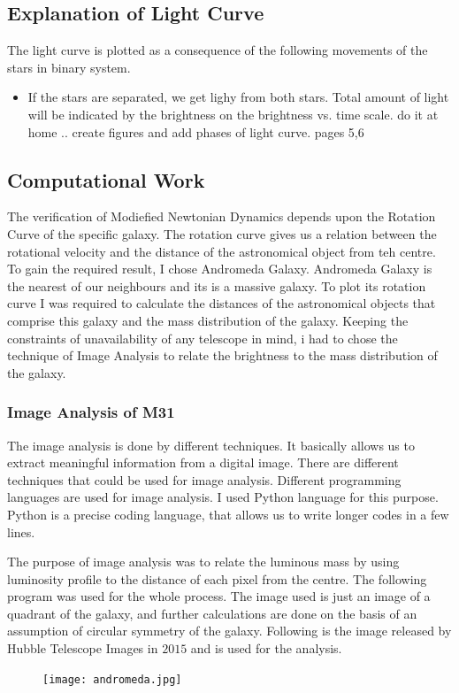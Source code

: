 \documentclass{article}
\begin{document}
\subsection*{Explanation of Light Curve}
The light curve is plotted as a consequence of the following movements of the stars in binary system.

\begin{itemize}
\item
If the stars are separated, we get lighy from both stars. Total amount of light will be indicated by the brightness on the brightness vs. time scale.
do it at home .. create figures and add phases of light curve. pages 5,6

\end{itemize}
\subsection{Computational Work}
The verification of Modiefied Newtonian Dynamics depends upon the Rotation Curve of the specific galaxy. The rotation curve gives us a relation between the rotational velocity and the distance of the astronomical object from teh centre. To gain the required result, I chose Andromeda Galaxy. Andromeda Galaxy is the nearest of our neighbours and its is a massive galaxy. To plot its rotation curve I was required to calculate the distances of the astronomical objects that comprise this galaxy and the mass distribution of the galaxy. Keeping the constraints of unavailability of any telescope in mind, i had to chose the technique of Image Analysis to relate the brightness to the mass distribution of the galaxy. 
\subsubsection{Image Analysis of M31}
The image analysis is done by different techniques. It basically allows us to extract meaningful information from a digital image. There are different techniques that could be used for image analysis. Different programming languages are used for image analysis. I used Python language for this purpose. Python is a precise coding language, that allows us to write longer codes in a few lines. 

The purpose of image analysis was to relate the luminous mass by using luminosity profile to the distance of each pixel from the centre. The following program was used for the whole process. The image used is just an image of a quadrant of the galaxy, and further calculations are done on the basis of an assumption of circular symmetry of the galaxy. Following is the image released by Hubble Telescope Images in $2015$ and is used for the analysis. 
\begin{figure}[h!]
\centering
\texttt{[image: andromeda.jpg]}
\end{figure}
\end{document}
